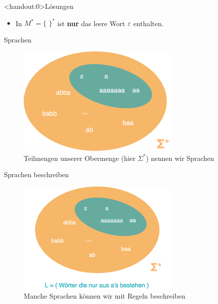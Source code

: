 {
\begin{frame}<handout:0>{Lösungen}
  \begin{itemize}
        \item In $M^{*} = \{$ $ \}^{*}$ ist \textbf{nur} das leere Wort $\varepsilon$ enthalten.
    \end{itemize}
\end{frame}
}

\begin{frame}[fragile]{Sprachen}
\begin{figure}
    \centering
    \includegraphics[width=0.7\textwidth]{../figures/MysterySprache.png}
    \caption{Teilmengen unserer Obermenge (hier $\Sigma^*$) nennen wir Sprachen}
    \label{fig:my_label}
\end{figure}
\end{frame}

\begin{frame}[fragile]{Sprachen beschreiben}
\begin{figure}
    \centering
    \includegraphics[width=0.7\textwidth]{../figures/SprachReveal.png}
    \caption{Manche Sprachen können wir mit Regeln beschreiben}
    \label{fig:my_label}
\end{figure}
\end{frame}


